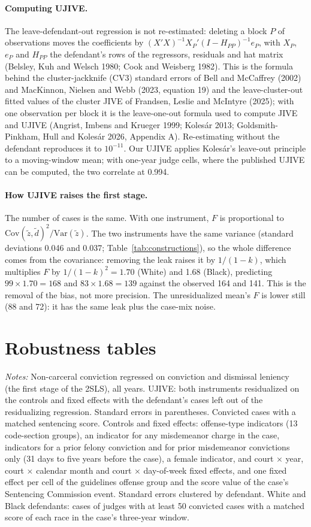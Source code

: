 \documentclass[11pt]{article}
\newcommand{\tabnote}[1]{\par\vspace{0.6ex}\begin{minipage}{\linewidth}\linespread{1}\footnotesize\textit{Notes:} #1\end{minipage}}
\newcommand{\controlsnote}{offense-type indicators (13 code-section groups), an indicator for any misdemeanor charge in the case, indicators for a prior felony conviction and for prior misdemeanor convictions only (31 days to five years before the case), a female indicator, and court $\times$ year, court $\times$ calendar month and court $\times$ day-of-week fixed effects}
\newcommand{\specnoteprim}{Convicted cases with a matched sentencing score. Controls and fixed effects: \controlsnote, and one fixed effect per cell of the guidelines offense group and the score value of the case's Sentencing Commission event. Standard errors clustered by defendant.}
\newcommand{\racesamplenote}{White and Black defendants: cases of judges with at least 50 convicted cases with a matched score of each race in the case's three-year window.}
\begin{document}
\paragraph{Computing UJIVE.} The leave-defendant-out regression is not re-estimated: deleting a block $P$ of observations moves the coefficients by $(X'X)^{-1}X_P'(I - H_{PP})^{-1}e_P$, with $X_P$, $e_P$ and $H_{PP}$ the defendant's rows of the regressors, residuals and hat matrix (Belsley, Kuh and Welsch 1980; Cook and Weisberg 1982). This is the formula behind the cluster-jackknife (CV3) standard errors of Bell and McCaffrey (2002) and MacKinnon, Nielsen and Webb (2023, equation 19) and the leave-cluster-out fitted values of the cluster JIVE of Frandsen, Leslie and McIntyre (2025); with one observation per block it is the leave-one-out formula used to compute JIVE and UJIVE (Angrist, Imbens and Krueger 1999; Kolesár 2013; Goldsmith-Pinkham, Hull and Kolesár 2026, Appendix A). Re-estimating without the defendant reproduces it to $10^{-11}$. Our UJIVE applies Kolesár's leave-out principle to a moving-window mean; with one-year judge cells, where the published UJIVE can be computed, the two correlate at 0.994.

\paragraph{How UJIVE raises the first stage.} The number of cases is the same. With one instrument, $F$ is proportional to $\mathrm{Cov}(\tilde z, \tilde d)^2/\mathrm{Var}(\tilde z)$. The two instruments have the same variance (standard deviations 0.046 and 0.037; Table~\ref{tab:constructions}), so the whole difference comes from the covariance: removing the leak raises it by $1/(1-k)$, which multiplies $F$ by $1/(1-k)^2 = 1.70$ (White) and 1.68 (Black), predicting $99 \times 1.70 = 168$ and $83 \times 1.68 = 139$ against the observed 164 and 141. This is the removal of the bias, not more precision. The unresidualized mean's $F$ is lower still (88 and 72): it has the same leak plus the case-mix noise.

\clearpage
\section{Robustness tables}\label{sec:robust_tables}

\begin{table}[H]
\centering
\caption{First stages with UJIVE instruments}\label{tab:fs_rob}
{\small}
\tabnote{Non-carceral conviction regressed on conviction and dismissal leniency (the first stage of the 2SLS), all years. UJIVE: both instruments residualized on the controls and fixed effects with the defendant's cases left out of the residualizing regression. Standard errors in parentheses. \specnoteprim{} \racesamplenote}
\end{table}
\end{document}
